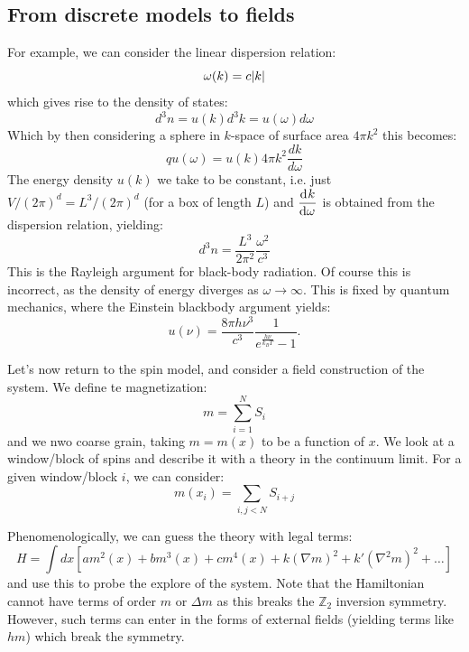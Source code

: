 \subsection{From discrete models to fields}
For example, we can consider the linear dispersion relation:
\begin{equation}
    \omega(k) = c\lvert k \rvert
\end{equation}
which gives rise to the density of states:
\begin{equation}
    d^3n = u(k)d^3k = u(\omega)d\omega
\end{equation}
Which by then considering a sphere in $k$-space of surface area $4\pi k^2$ this becomes:
\begin{equation}
    qu(\omega) = u(k)4\pi k^2 \frac{dk}{d\omega}
\end{equation}
The energy density $u(k)$ we take to be constant, i.e. just $V/(2\pi)^d = L^3/(2\pi)^d$ (for a box of length $L$) and $\dod{k}{\omega}$ is obtained from the dispersion relation, yielding:
\begin{equation}
    d^3n = \frac{L^3}{2\pi^2}\frac{\omega^2}{c^3}
\end{equation}
This is the Rayleigh argument for black-body radiation. Of course this is incorrect, as the density of energy diverges as $\omega \to \infty$. This is fixed by quantum mechanics, where the Einstein blackbody argument yields:
\begin{equation}
    u(\nu) = \frac{8\pi h\nu^3}{c^3}\frac{1}{e^{\frac{h\nu}{k_B T}} - 1}.
\end{equation}

Let's now return to the spin model, and consider a field construction of the system. We define te magnetization:
\begin{equation}
    m = \sum_{i=1}^N S_i
\end{equation}
and we nwo coarse grain, taking $m = m(x)$ to be a function of $x$. We look at a window/block of spins and describe it with a theory in the continuum limit. For a given window/block $i$, we can consider:
\begin{equation}
    m(x_i) = \sum_{i, j < N} S_{i+j}
\end{equation}

Phenomenologically, we can guess the theory with legal terms:
\begin{equation}\label{eq:GinzLandau}
    H = \int dx \left[am^2(x) + bm^3(x) + cm^4(x) + k(\nabla m)^2 + k'(\nabla^2 m)^2 + \ldots \right]
\end{equation}
and use this to probe the explore of the system. Note that the Hamiltonian cannot have terms of order $m$ or $\Delta m$ as this breaks the $\mathbb{Z}_2$ inversion symmetry. However, such terms can enter in the forms of external fields (yielding terms like $hm$) which break the symmetry.

